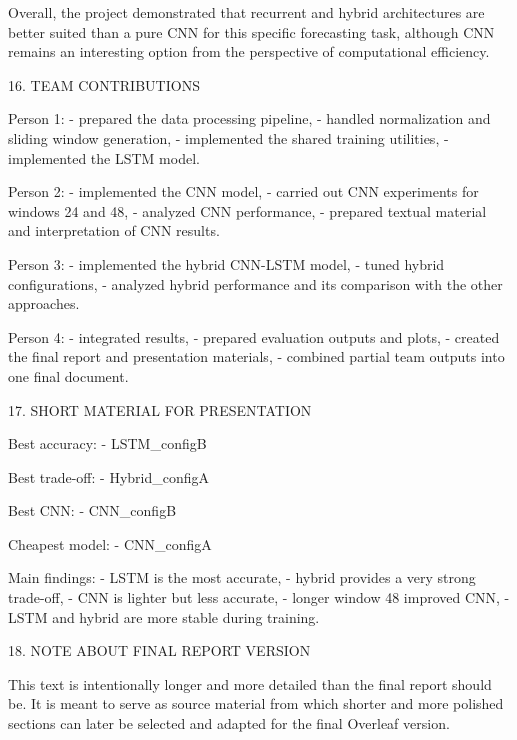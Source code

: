 Overall, the project demonstrated that recurrent and hybrid architectures are better suited than a pure CNN for this specific forecasting task, although CNN remains an interesting option from the perspective of computational efficiency.

16. TEAM CONTRIBUTIONS

Person 1:
- prepared the data processing pipeline,
- handled normalization and sliding window generation,
- implemented the shared training utilities,
- implemented the LSTM model.

Person 2:
- implemented the CNN model,
- carried out CNN experiments for windows 24 and 48,
- analyzed CNN performance,
- prepared textual material and interpretation of CNN results.

Person 3:
- implemented the hybrid CNN-LSTM model,
- tuned hybrid configurations,
- analyzed hybrid performance and its comparison with the other approaches.

Person 4:
- integrated results,
- prepared evaluation outputs and plots,
- created the final report and presentation materials,
- combined partial team outputs into one final document.

17. SHORT MATERIAL FOR PRESENTATION

Best accuracy:
- LSTM_configB

Best trade-off:
- Hybrid_configA

Best CNN:
- CNN_configB

Cheapest model:
- CNN_configA

Main findings:
- LSTM is the most accurate,
- hybrid provides a very strong trade-off,
- CNN is lighter but less accurate,
- longer window 48 improved CNN,
- LSTM and hybrid are more stable during training.

18. NOTE ABOUT FINAL REPORT VERSION

This text is intentionally longer and more detailed than the final report should be. It is meant to serve as source material from which shorter and more polished sections can later be selected and adapted for the final Overleaf version.